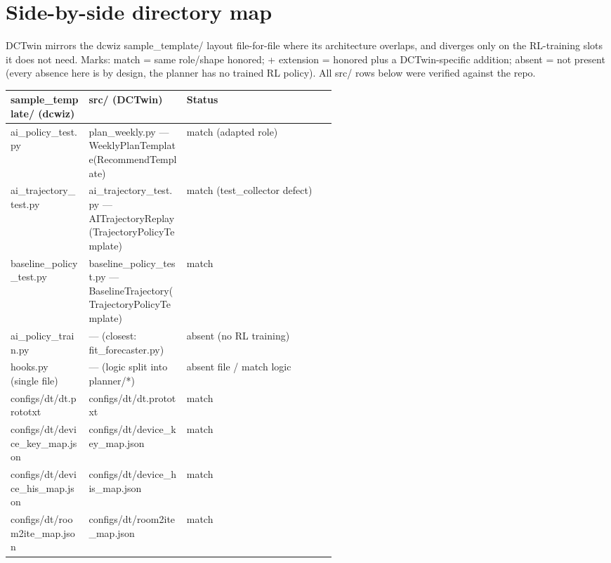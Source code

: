 \documentclass[10pt]{article}
\begin{document}
\section*{Side-by-side directory map}
DCTwin mirrors the dcwiz sample\_\allowbreak{}template/\allowbreak{} layout file-for-file where its architecture overlaps, and diverges only on the RL-training slots it does not need. Marks: match = same role/\allowbreak{}shape honored; + extension = honored plus a DCTwin-specific addition; absent = not present (every absence here is by design, the planner has no trained RL policy). All src/\allowbreak{} rows below were verified against the repo.

\vspace{1pt}\begin{tabularx}{\linewidth}{@{}p{0.24\linewidth} p{0.30\linewidth} X@{}}
\toprule
\textbf{sample\_\allowbreak{}template/\allowbreak{} (dcwiz)} & \textbf{src/\allowbreak{} (DCTwin)} & \textbf{Status} \\
\midrule
ai\_\allowbreak{}policy\_\allowbreak{}test.py & plan\_\allowbreak{}weekly.py — WeeklyPlanTemplate(RecommendTemplate) & match (adapted role) \\
ai\_\allowbreak{}trajectory\_\allowbreak{}test.py & ai\_\allowbreak{}trajectory\_\allowbreak{}test.py — AITrajectoryReplay(TrajectoryPolicyTemplate) & match (test\_\allowbreak{}collector defect) \\
baseline\_\allowbreak{}policy\_\allowbreak{}test.py & baseline\_\allowbreak{}policy\_\allowbreak{}test.py — BaselineTrajectory(TrajectoryPolicyTemplate) & match \\
ai\_\allowbreak{}policy\_\allowbreak{}train.py & — (closest: fit\_\allowbreak{}forecaster.py) & absent (no RL training) \\
hooks.py (single file) & — (logic split into planner/\allowbreak{}*) & absent file /\allowbreak{} match logic \\
configs/\allowbreak{}dt/\allowbreak{}dt.prototxt & configs/\allowbreak{}dt/\allowbreak{}dt.prototxt & match \\
configs/\allowbreak{}dt/\allowbreak{}device\_\allowbreak{}key\_\allowbreak{}map.json & configs/\allowbreak{}dt/\allowbreak{}device\_\allowbreak{}key\_\allowbreak{}map.json & match \\
configs/\allowbreak{}dt/\allowbreak{}device\_\allowbreak{}his\_\allowbreak{}map.json & configs/\allowbreak{}dt/\allowbreak{}device\_\allowbreak{}his\_\allowbreak{}map.json & match \\
configs/\allowbreak{}dt/\allowbreak{}room2ite\_\allowbreak{}map.json & configs/\allowbreak{}dt/\allowbreak{}room2ite\_\allowbreak{}map.json & match \\

\end{tabularx}
\end{document}
